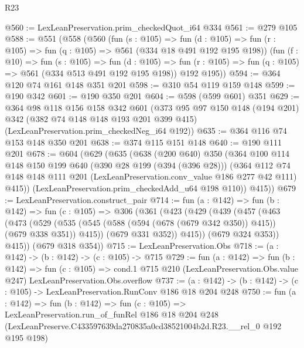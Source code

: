 \begin{lexlean}{R23}
\begin{coremodule}
@560 := LexLeanPreservation.prim_checkedQuot_i64 @334
@561 := @279 @105
@588 := @551
    (@558
      (@560
        (fun (s : @105) =>
        fun (d : @105) => fun (r : @105) => fun (q : @105) => @561 (@334 @18 @491 @192 @195 @198))
        (fun (f : @10) =>
        fun (s : @105) =>
        fun (d : @105) => fun (r : @105) => fun (q : @105) => @561 (@334 @513 @491 @192 @195 @198))
        @192
        @195))
@594 := @364 @120 @74 @161 @148 @351 @201
@598 := @310 @54 @119 @159 @148
@599 := @190 @342
@601 := @190 @350 @201
@604 := @598 (@599 @601) @351
@629 := @364
    @98
    @118
    @156
    @158
    @342
    @601
    (@373
      @95
      @97
      @150
      @148
      (@194 @201)
      @342
      (@382 @74 @148 @148 @193 @201 @399 @415)
      (LexLeanPreservation.prim_checkedNeg_i64 @192))
@635 := @364 @116 @74 @153 @148 @350 @201
@638 := @374 @115 @151 @148
@640 := @190 @111 @201
@678 := @604
    (@629
      (@635
        (@638
          (@200 @640)
          @350
          (@364
            @100
            @114
            @148
            @150
            @199
            @640
            (@390 @28 @199 (@394 (@396 @28)))
            (@364
              @112
              @74
              @148
              @148
              @111
              @201
              (LexLeanPreservation.conv_value @186 @277 @42 @111)
              @415))
          (LexLeanPreservation.prim_checkedAdd_u64 @198 @110))
        @415))
@679 := LexLeanPreservation.construct_pair
@714 := fun (a : @142) =>
  fun (b : @142) =>
  fun (c : @105) =>
  @306
    (@361
      (@423
        (@429
          (@439
            (@457
              (@463
                (@473
                  (@529
                    (@535 (@545 (@588 (@594 (@678 (@679 @342 @350)) @415)) (@679 @338 @351)) @415))
                  (@679 @331 @352))
                @415))
            (@679 @324 @353))
          @415))
      (@679 @318 @354))
@715 := LexLeanPreservation.Obs
@718 := (a : @142) -> (b : @142) -> (c : @105) -> @715
@729 := fun (a : @142) =>
  fun (b : @142) =>
  fun (c : @105) =>
  cond.{1} @715 @210 (LexLeanPreservation.Obs.value @247) LexLeanPreservation.Obs.overflow
@737 := (a : @142) -> (b : @142) -> (c : @105) -> LexLeanPreservation.RunConv @186 @18 @204 @248
@750 := fun (a : @142) =>
  fun (b : @142) =>
  fun (c : @105) =>
  LexLeanPreservation.run_of_funRel
    @186
    @18
    @204
    @248
    (LexLeanPreserve.C433597639da270835a0cd38521004b2d.R23.__rel_0 @192 @195 @198)
\end{coremodule}
\end{lexlean}
